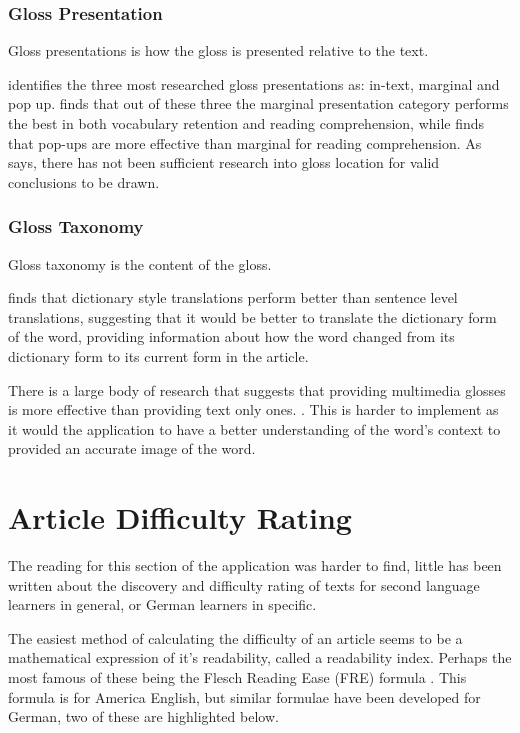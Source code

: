 \subsubsection{Gloss Presentation}

Gloss presentations is how the gloss is presented relative to the text. 

\textcite{chen2016} identifies the three most researched gloss presentations as: in-text, marginal and pop up.  \textcite{abuseileek2008} finds that out of these three the marginal presentation category performs the best in both vocabulary retention and reading comprehension, while \textcite{marefat2016} finds that pop-ups are more effective than marginal for reading comprehension. As \textcite{chen2016} says, there has not been sufficient research into gloss location for valid conclusions to be drawn. 

\subsubsection{Gloss Taxonomy}

Gloss taxonomy is the content of the gloss.

\textcite{gettys2001} finds that dictionary style translations perform better than sentence level translations, suggesting that it would be better to translate the dictionary form of the word, providing information about how the word changed from its dictionary form to its current form in the article. 

There is a large body of research that suggests that providing multimedia glosses is more effective than providing text only ones. \autocite{yoshii2006, kost1999}. This is harder to implement  as it would the application to have a better understanding of the word's context to provided an accurate image of the word. 


\section{Article Difficulty Rating}

The reading for this section of the application was harder to find, little has been written about the discovery and difficulty rating of texts for second language learners in general, or German learners in specific. 

The easiest method of calculating the difficulty of an article seems to be a mathematical expression of it's readability, called a readability index. Perhaps the most famous of these being the Flesch Reading Ease (FRE) formula \autocite{flesch1948}. This formula is for America English, but similar formulae have been developed for German, two of these are highlighted below.

